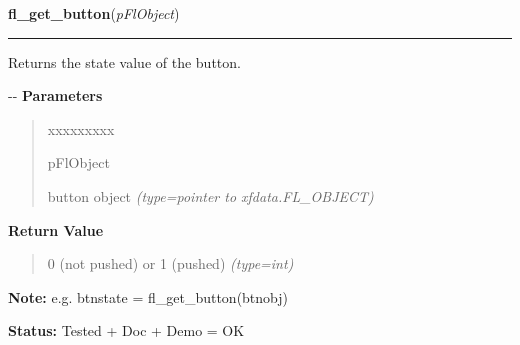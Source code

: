 \hspace{.8\funcindent}\begin{boxedminipage}{\funcwidth}

    \raggedright \textbf{fl\_get\_button}(\textit{pFlObject})

    \vspace{-1.5ex}

    \rule{\textwidth}{0.5\fboxrule}
\setlength{\parskip}{2ex}

Returns the state value of the button.

-{}-
\setlength{\parskip}{1ex}
      \textbf{Parameters}
      \vspace{-1ex}

      \begin{quote}
        \begin{Ventry}{xxxxxxxxx}

          \item[pFlObject]


button object
            {\it (type=pointer to xfdata.FL\_OBJECT)}

        \end{Ventry}

      \end{quote}

      \textbf{Return Value}
    \vspace{-1ex}

      \begin{quote}

0 (not pushed) or 1 (pushed)
      {\it (type=int)}

      \end{quote}

\textbf{Note:} 
e.g. btnstate = fl\_get\_button(btnobj)


\textbf{Status:} 
Tested + Doc + Demo = OK


    \end{boxedminipage}

    \label{xformslib:flbutton:fl_set_button}

    \vspace{0.5ex}

